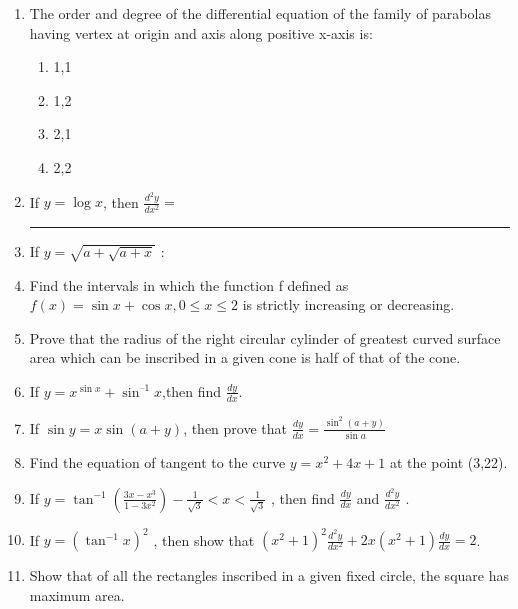 \begin{enumerate}[label=\thesection.\arabic*.,ref=\thesection.\theenumi]

\item The order and degree of the differential equation of the family of parabolas having vertex at origin and axis along positive x-axis is:


\begin{enumerate}
\item 1,1
\item 1,2
\item 2,1
\item 2,2
\end{enumerate}

\item If $y = \log x$, then $\frac{d^2y}{dx^2}=$ \rule{30pt}{1pt}

\item If $y=\sqrt{a+\sqrt{a+x}}$ :

\item Find the intervals in which the function f defined as $f(x) = \sin x + \cos x, 0\le x \le 2$ is strictly increasing or decreasing.

\item Prove that the radius of the right circular cylinder of greatest curved surface area which can be inscribed in a given cone is half of that of the cone.

\item If $y=x^{\sin x}+\sin^{–1}x$,then find $\frac{dy}{dx}$.

\item If $\sin y=x\sin(a+y)$, then prove that $\frac{dy}{dx}=\frac{\sin^2(a+y)}{\sin a}$ 


\item Find the equation of tangent to the curve $y=x^2+4x+1$ at the point (3,22).



\item If $y=\tan^{-1}(\frac{3x-x^3}{1-3x^2})-\frac{1}{\sqrt{3}}<x<\frac{1}{\sqrt{3}}$ , then find $\frac{dy}{dx}$ and $\frac{d^2y}{dx^2}$ .


    
\item If $y=(\tan^{-1} x)^2$ , then show that $(x^2+1)^2 \frac{d^2y}{dx^2}+2x(x^2+1) \frac{dy}{dx}=2$.

\item Show that of all the rectangles inscribed in a given fixed circle, the square has maximum area.
  


\end{enumerate}
